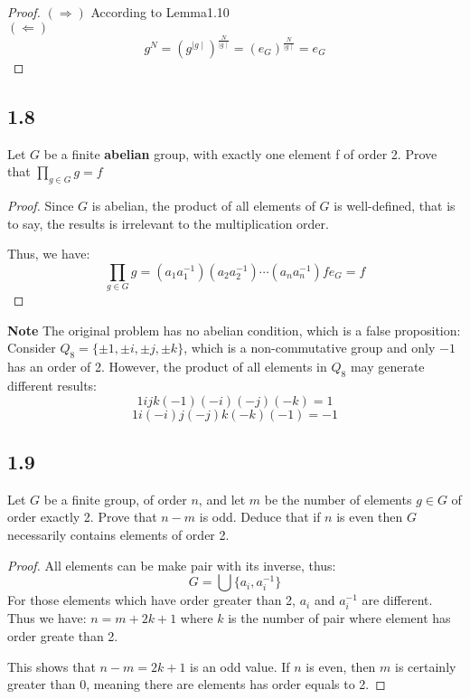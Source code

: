\documentclass[a4paper, pdf, 12pt]{article}
\begin{document}
\begin{proof}
  $(\Rightarrow)$ According to Lemma1.10\\
  \indent\indent $(\Leftarrow)$ $$g^N=(g^{\mid g\mid})^{\frac{N}{\mid g\mid}}=(e_G)^{\frac{N}{\mid g\mid}}=e_G$$
\end{proof}

\subsection*{1.8} Let $G$ be a finite {\color{red}\textbf{abelian}} group, with exactly one element f of order 2. Prove that $\prod_{g\in G}g=f$
\begin{proof}
  Since $G$ is abelian, the product of all elements of $G$ is well-defined, that is to say, the results is irrelevant to the multiplication order.

  Thus, we have:
  $$
    \prod_{g\in G}g = (a_1a_1^{-1})(a_2a_2^{-1})\cdots(a_na_n^{-1})fe_G=f
  $$
\end{proof}
\noindent \textbf{Note} The original problem has no abelian condition, which is a false proposition: Consider
$Q_8=\{\pm 1, \pm i, \pm j, \pm k\}$, which is a non-commutative group and only $-1$ has an order of 2. However, the
product of all elements in $Q_8$ may generate different results:
$$
  1ijk(-1)(-i)(-j)(-k) = 1
$$
$$
  1i(-i)j(-j)k(-k)(-1) = -1
$$

\subsection*{1.9} Let $G$ be a finite group, of order $n$, and let $m$ be the number of
elements $g \in G$ of order exactly 2. Prove that $n-m$ is odd. Deduce that if $n$ is even then
$G$ necessarily contains elements of order 2.
\begin{proof}
  All elements can be make pair with its inverse, thus:
  $$
    G=\bigcup \{a_i, a_i^{-1}\}
  $$
  For those elements which have order greater than 2, $a_i$ and $a_i^{-1}$ are different. Thus we have:
  $n = m + 2k + 1$ where $k$ is the number of pair where element has order greate than 2.

  This shows that $n-m=2k+1$ is an odd value. If $n$ is even, then $m$ is certainly greater than 0, meaning there
  are elements has order equals to 2.
\end{proof}
\end{document}
